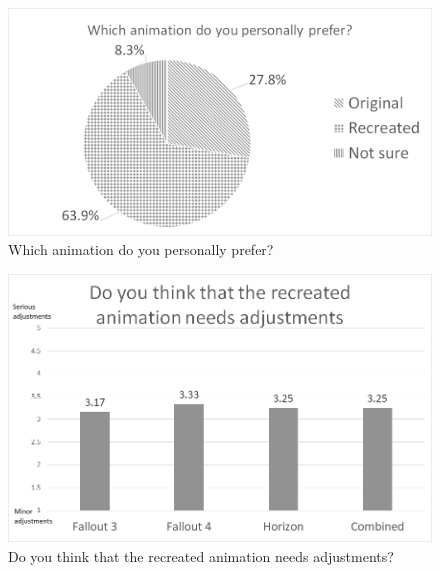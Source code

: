 \begin{figure}[!ht]
\centerline{\includegraphics[width = 42em]{img/results/prefer.png}}
\caption{Which animation do you personally prefer?}\label{fig:prefer_graph}
\end{figure}


\begin{figure}[!ht]
	\centerline{\includegraphics[width = 42em]{img/results/adjustments.png}}
	\caption{Do you think that the recreated animation needs adjustments?}\label{fig:adjustments_graph}
\end{figure}











